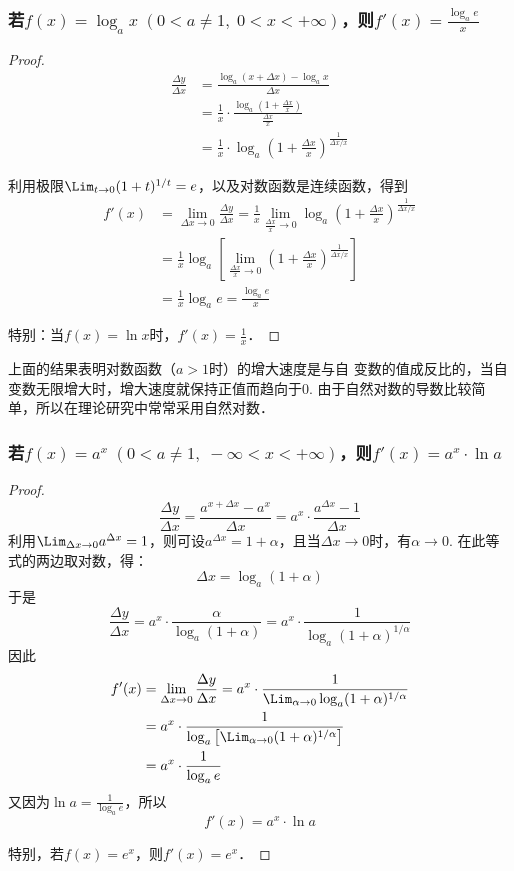 \subsubsection{若$f(x)=\log_a x\; (0<a\ne 1,\; 0<x<+\infty)$，则$f'(x)=\frac{\log_a e}{x}$}

\begin{proof}
\begin{align*}
    \frac{\Delta y}{\Delta x}&=\frac{\log_a(x+\Delta x)-\log_a x}{\Delta x}\\
    &=\frac{1}{x}\cdot \frac{\log_a\left(1+\frac{\Delta x}{x}\right)}{\frac{\Delta x}{x}}\\
    &=\frac{1}{x}\cdot \log_a\left(1+\frac{\Delta x}{x}\right)^{\tfrac{1}{\Delta x/x}}
\end{align*}  

利用极限$\Lim_{t\to 0}(1+t)^{1/t}=e$，以及对数函数是连续函数，得到
\begin{align*}
    f'(x)&=\lim_{\Delta x\to 0}\frac{\Delta y}{\Delta x}=\frac{1}{x}\lim_{\tfrac{\Delta x}{x}\to 0}\log_a\left(1+\frac{\Delta x}{x}\right)^{\tfrac{1}{\Delta x/x}}\\
    &=\frac{1}{x}\log_a\left[\lim_{\tfrac{\Delta x}{x}\to 0}\left(1+\frac{\Delta x}{x}\right)^{\tfrac{1}{\Delta x/x}}\right]\\
    &=\frac{1}{x}\log_a e=\frac{\log_a e}{x}
\end{align*}

特别：当$f(x)=\ln x$时，$f'(x)=\frac{1}{x}$．
\end{proof}

上面的结果表明对数函数（$a>1$时）的增大速度是与自
变数的值成反比的，当自变数无限增大时，增大速度就保持正值而趋向于0. 由于自然对数的导数比较简单，所以在理论研究中常常采用自然对数．

\subsubsection{若$f(x)=a^x\; (0<a\ne 1,\; -\infty<x<+\infty)$，则$f'(x)=a^x\cdot \ln a$}

\begin{proof}
    \[\frac{\Delta y}{\Delta x}=\frac{a^{x+\Delta x}-a^x}{\Delta x}=a^x\cdot \frac{a^{\Delta x}-1}{\Delta x}\]
利用$\Lim_{\Delta x\to 0}a^{\Delta x}=1$，则可设$a^{\Delta x}=1+\alpha$，且当$\Delta x\to 0$时，有$\alpha\to 0$. 在此等式的两边取对数，得：
\[\Delta x=\log_a(1+\alpha)\]
于是
\[\frac{\Delta y}{\Delta x}=a^x\cdot \frac{\alpha}{\log_a(1+\alpha)}=a^x\cdot \frac{1}{\log_a(1+\alpha)^{1/\alpha}}\]
因此
\begin{align*}
    f'(x)&=\lim_{\Delta x\to 0}\frac{\Delta y}{\Delta x}=a^x\cdot \frac{1}{\Lim_{\alpha\to 0}\log_a(1+\alpha)^{1/\alpha}}\\
    &=a^x\cdot \frac{1}{\log_a\left[\Lim_{\alpha\to 0}(1+\alpha)^{1/\alpha}\right]}\\
    &=a^x\cdot \frac{1}{\log_a e}
\end{align*}
又因为$\ln a=\frac{1}{\log_a e}$，所以
\[f'(x)=a^x\cdot \ln a\]

特别，若$f(x)=e^x$，则$f'(x)=e^x$．
\end{proof}

